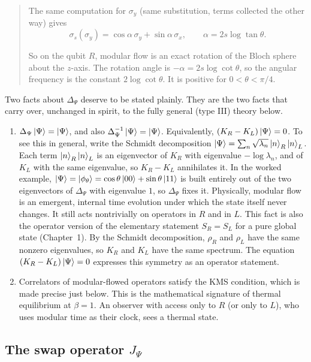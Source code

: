 \begin{quote}
\begin{enumerate}
\begin{itemize}
The same computation for $\sigma_y$ (same substitution, terms collected the other way) gives
\[
\sigma_s(\sigma_y) = \cos\alpha\,\sigma_y + \sin\alpha\,\sigma_x , \qquad \alpha=2s\log\tan\theta .
\]
\end{itemize}
So on the qubit $R$, modular flow is an exact rotation of the Bloch sphere about the $z$-axis. The rotation
angle is $-\alpha=2s\log\cot\theta$, so the angular frequency is the constant $2\log\cot\theta$. It is
positive for $0<\theta<\pi/4$.
\end{enumerate}
\end{quote}

Two facts about $\Delta_\Psi$ deserve to be stated plainly. They are the two facts that carry over, unchanged
in spirit, to the fully general (type III) theory below.

\begin{enumerate}
\item $\Delta_\Psi\ket\Psi=\ket\Psi$, and also $\Delta_\Psi^{-1}\ket\Psi=\ket\Psi$. Equivalently,
$(K_R-K_L)\ket\Psi=0$. To see this in general, write the Schmidt decomposition
$\ket\Psi=\sum_n\sqrt{\lambda_n}\ket n_R\ket n_L$. Each term $\ket n_R\ket n_L$ is an eigenvector of $K_R$
with eigenvalue $-\log\lambda_n$, and of $K_L$ with the same eigenvalue, so $K_R-K_L$ annihilates it. In the
worked example, $\ket\Psi=\ket{\phi_\theta}=\cos\theta\ket{00}+\sin\theta\ket{11}$ is built entirely out of
the two eigenvectors of $\Delta_\Psi$ with eigenvalue $1$, so $\Delta_\Psi$ fixes it. Physically, modular flow
is an emergent, internal time evolution under which the state itself never changes. It still acts nontrivially
on operators in $R$ and in $L$. This fact is also the operator version of the elementary statement $S_R=S_L$
for a pure global state (Chapter~1). By the Schmidt decomposition, $\rho_R$ and $\rho_L$ have the same nonzero
eigenvalues, so $K_R$ and $K_L$ have the same spectrum. The equation $(K_R-K_L)\ket\Psi=0$ expresses this
symmetry as an operator statement.
\item Correlators of modular-flowed operators satisfy the KMS condition, which is made precise just below. This
is the mathematical signature of thermal equilibrium at $\beta=1$. An observer with access only to $R$ (or only
to $L$), who uses modular time as their clock, sees a thermal state.
\end{enumerate}

\subsection*{The swap operator $J_\Psi$}

